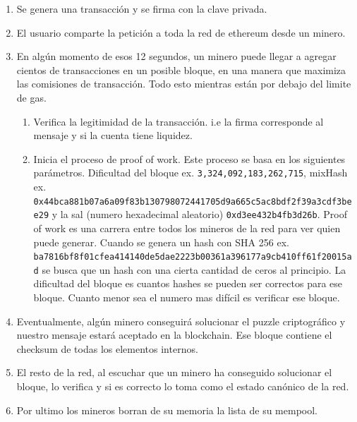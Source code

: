 \begin{enumerate}
    \item Se genera una transacción y se firma con la clave privada.
    \item El usuario comparte la petición a toda la red de ethereum desde un minero.
    \item En algún momento de esos 12 segundos, un minero puede llegar a agregar cientos de transacciones en un posible bloque, en una manera que maximiza las comisiones de transacción. Todo esto mientras están por debajo del limite de gas.
    \begin{enumerate}
        \item Verifica la legitimidad de la transacción. i.e la firma corresponde al mensaje y si la cuenta tiene liquidez.
        \item Inicia el proceso de proof of work. Este proceso se basa en los siguientes parámetros. Dificultad del bloque ex. \texttt{3,324,092,183,262,715}, mixHash ex.\\ \texttt{0x44bca881b07a6a09f83b130798072441705d9a665c5ac8bdf2f39a3cdf3bee29} y la sal (numero hexadecimal aleatorio) \texttt{0xd3ee432b4fb3d26b}. Proof of work es una carrera entre todos los mineros de la red para ver quien puede generar. Cuando se genera un hash con SHA 256 ex. \\\texttt{ba7816bf8f01cfea414140de5dae2223b00361a396177a9cb410ff61f20015ad} se busca que un hash con una cierta cantidad de ceros al principio. La dificultad del bloque es cuantos hashes se pueden ser correctos para ese bloque. Cuanto menor sea el numero mas difícil es verificar ese bloque.
    \end{enumerate}
    \item Eventualmente, algún minero conseguirá solucionar el puzzle criptográfico y nuestro mensaje estará aceptado en la blockchain. Ese bloque contiene el checksum de todas los elementos internos.
    \item El resto de la red, al escuchar que un minero ha conseguido solucionar el bloque, lo verifica y si es correcto lo toma como el estado canónico de la red.
    \item Por ultimo los mineros borran de su memoria la lista de su mempool.
\end{enumerate}
